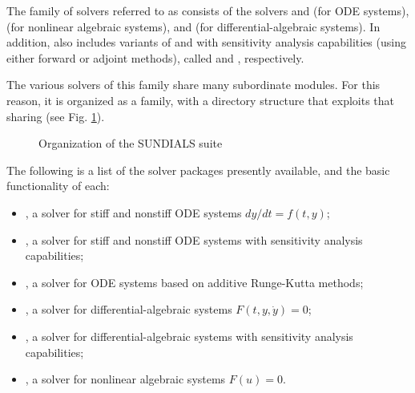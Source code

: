 %
The family of solvers referred to as {\sundials} consists of the solvers
{\cvode} and {\arkode} (for ODE systems), {\kinsol} (for nonlinear algebraic
systems), and {\ida} (for differential-algebraic systems).  In addition,
{\sundials} also includes variants of {\cvode} and {\ida} with sensitivity analysis 
capabilities (using either forward or adjoint methods), called {\cvodes} and
{\idas}, respectively.

The various solvers of this family share many subordinate modules.
For this reason, it is organized as a family, with a directory
structure that exploits that sharing (see Fig. \ref{f:sunorg}).
\begin{figure}
\caption {Organization of the SUNDIALS suite}\label{f:sunorg}
\end{figure}
The following is a list of the solver packages presently available, and
the basic functionality of each:
\begin{itemize}

\item {\cvode},  
  a solver for stiff and nonstiff ODE systems $dy/dt = f(t,y)$;

\item {\cvodes},
  a solver for stiff and nonstiff ODE systems with sensitivity analysis capabilities;

\item {\arkode},
  a solver for ODE systems based on additive Runge-Kutta methods;

\item {\ida},
  a solver for differential-algebraic systems $F(t,y,\dot{y}) = 0$;

\item {\idas},
  a solver for differential-algebraic systems
  with sensitivity analysis capabilities;

\item {\kinsol}, 
  a solver for nonlinear algebraic systems $F(u) = 0$.

\end{itemize}
